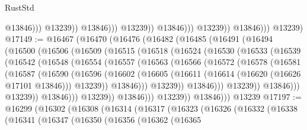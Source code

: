 \begin{lexlean}{RustStd}
\begin{coremodule}
                                          @13846)))
                                    @13239))
                                @13846)))
                          @13239))
                      @13846)))
                @13239))
            @13846)))
      @13239)
@17149 := @16467
    (@16470
      (@16476
        (@16482
          (@16485
            (@16491
              (@16494
                (@16500
                  (@16506
                    (@16509
                      (@16515
                        (@16518
                          (@16524
                            (@16530
                              (@16533
                                (@16539
                                  (@16542
                                    (@16548
                                      (@16554
                                        (@16557
                                          (@16563
                                            (@16566
                                              (@16572
                                                (@16578
                                                  (@16581
                                                    (@16587
                                                      (@16590
                                                        (@16596
                                                          (@16602
                                                            (@16605
                                                              (@16611
                                                                (@16614
                                                                  (@16620 (@16626 @17101 @13846)))
                                                                @13239))
                                                            @13846)))
                                                      @13239))
                                                  @13846)))
                                            @13239))
                                        @13846)))
                                  @13239))
                              @13846)))
                        @13239))
                    @13846)))
              @13239))
          @13846)))
    @13239
@17197 := @16299
    (@16302
      (@16308
        (@16314
          (@16317
            (@16323
              (@16326
                (@16332
                  (@16338
                    (@16341
                      (@16347
                        (@16350
                          (@16356
                            (@16362
                              (@16365

\end{coremodule}
\end{lexlean}
